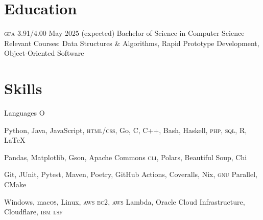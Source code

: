 \section{Education}
\begin{doutline}
     \textsc{gpa} 3.91/4.00
    \hfill May 2025 (expected)
        \2 Bachelor of Science in Computer Science
        \2 Relevant Courses: Data Structures \& Algorithms, Rapid Prototype Development, Object-Oriented Software
\end{doutline}

\section{Skills}
\begin{labeling}{Languages O}
    \item [Languages] Python, Java, JavaScript, \textsc{html/css}, Go, C, C++, Bash, Haskell, \textsc{php}, \textsc{sql}, R, \LaTeX
    \item [Libraries] Pandas, Matplotlib, Gson, Apache Commons \textsc{cli}, Polars, Beautiful Soup, Chi
    \item [Tools] Git, JUnit, Pytest, Maven, Poetry, GitHub Actions, Coveralls, Nix, \textsc{gnu} Parallel, CMake
    \item [Platforms] Windows, mac\textsc{os}, Linux, \textsc{aws ec2}, \textsc{aws} Lambda, Oracle Cloud Infrastructure, Cloudflare, \textsc{ibm lsf}
\end{labeling}

